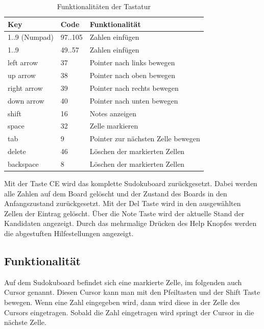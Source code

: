 \begin{table}[H]
	\centering
	\begin{tabular}{lll}
		\hline
		Key         & Code    & Funktionalität                     \\ \hline
		1..9 (Numpad)       & 97..105 & Zahlen einfügen                    \\
		1..9        & 49..57  & Zahlen einfügen                    \\
		left arrow  & 37      & Pointer nach links bewegen         \\
		up arrow    & 38      & Pointer nach oben bewegen          \\
		right arrow & 39      & Pointer nach rechts bewegen        \\
		down arrow  & 40      & Pointer nach unten bewegen         \\
		shift       & 16      & Notes anzeigen                     \\
		space       & 32      & Zelle markieren                    \\
		tab         & 9       & Pointer zur nächsten Zelle bewegen \\
		delete      & 46      & Löschen der markierten Zellen      \\
		backspace   & 8       & Löschen der markierten Zellen      \\ \hline
	\end{tabular}%
	\caption{Funktionalitäten der Tastatur}
	\label{tab:tastatur}
\end{table}

Mit der Taste \ac{CE} wird das komplette Sudokuboard zurückgesetzt. Dabei werden alle Zahlen auf dem Board gelöscht und der Zustand des Boards in den Anfangszustand zurückgesetzt. Mit der Del Taste wird in den ausgewählten Zellen der Eintrag gelöscht. Über die Note Taste wird der aktuelle Stand der Kandidaten angezeigt. Durch das mehrmalige Drücken des Help Knopfes werden die abgestuften Hilfestellungen angezeigt.

\subsection{Funktionalität}

Auf dem Sudokuboard befindet sich eine markierte Zelle, im folgenden auch Cursor genannt. Diesen Cursor kann man mit den Pfeiltasten und der Shift Taste bewegen. Wenn eine Zahl eingegeben wird, dann wird diese in der Zelle des Cursors eingetragen. Sobald die Zahl eingetragen wird springt der Cursor in die nächste Zelle. 

